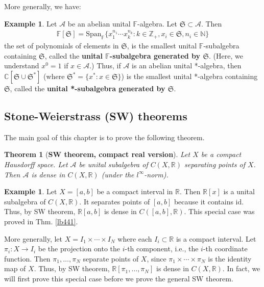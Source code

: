 \documentclass[12pt,b5paper,notitlepage]{article}
\theoremstyle{definition}
\newtheorem{eg}[df]{Example}
\theoremstyle{plain}
\newtheorem{thm}[df]{Theorem}
\newcommand{\fk}{\mathfrak}
\newcommand{\id}{\mathrm{id}}
\newcommand{\Span}{\mathrm{Span}}
\newcommand{\scr}{\mathscr}
\newcommand{\Cbb}{\mathbb C}
\newcommand{\Nbb}{\mathbb N}
\newcommand{\Zbb}{\mathbb Z}
\newcommand{\Rbb}{\mathbb R}
\newcommand{\Fbb}{\mathbb F}
\numberwithin{equation}{section}
\begin{document}
More generally, we have:

\begin{eg}
Let $\scr A$ be an abelian unital $\Fbb$-algebra. Let $\fk S\subset\scr A$. Then \index{FS@$\Fbb[\fk S]$}
\begin{align}
\Fbb[\fk S]=\Span_\Fbb\{x_1^{n_1}\cdots x_k^{n_k}:k\in\Zbb_+,x_i\in\fk S,n_i\in\Nbb\}
\end{align}
the set of polynomials of elements in $\fk S$, is the smallest unital $\Fbb$-subalgebra containing $\fk S$, called the \textbf{unital $\Fbb$-subalgebra generated by $\fk S$}.  (Here, we understand $x^0=1$ if $x\in\scr A$.) Thus, if $\scr A$ is an abelian unital *-algebra, then $\Cbb[\fk S\cup\fk S^*]$ (where $\fk S^*=\{x^*:x\in\fk S\}$) is the smallest unital *-algebra containing $\fk S$, called the \textbf{unital *-subalgebra generated by $\fk S$}.
\end{eg}



\subsection{Stone-Weierstrass (SW) theorems} 




The main goal of this chapter is to prove the following theorem.

\begin{thm}[\textbf{SW theorem, compact real version}]\label{lb442}
Let $X$ be a compact Hausdorff space. Let $\scr A$ be unital subalgebra of $C(X,\Rbb)$ separating points of $X$. Then $\scr A$ is dense in $C(X,\Rbb)$ (under the $l^\infty$-norm).
\end{thm}

\begin{eg}
Let $X=[a,b]$ be a compact interval in $\Rbb$. Then $\Rbb[x]$ is a unital subalgebra of $C(X,\Rbb)$. It separates points of $[a,b]$ because it contains $\id$. Thus, by SW theorem, $\Rbb[a,b]$ is dense in $C([a,b],\Rbb)$. This special case was proved in Thm. \ref{lb441}.

More generally, let $X=I_1\times\cdots\times I_N$ where each $I_i\subset\Rbb$ is a compact interval. Let $\pi_i:X\rightarrow I_i$ be the projection onto the $i$-th component, i.e., the $i$-th coordinate function. Then $\pi_1,\dots,\pi_N$ separate points of $X$, since $\pi_1\times\cdots\times\pi_N$ is the identity map of $X$. Thus, by SW theorem, $\Rbb[\pi_1,\dots,\pi_N]$ is dense in $C(X,\Rbb)$. In fact, we will first prove this special case before we prove the general SW theorem. \hfill\qedsymbol
\end{eg}
\end{document}
